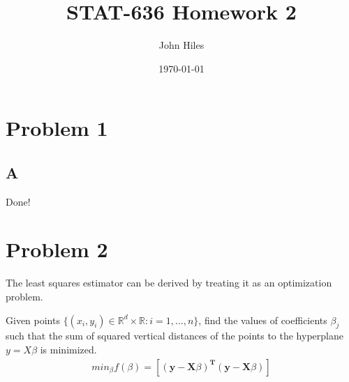 \documentclass{article}
\title{STAT-636 Homework 2}
\author{John Hiles}
\date\today
\begin{document}
\maketitle %

\section*{Problem 1}
\subsection*{A}
Done!
\section*{Problem 2}
The least squares estimator can be derived by treating it as an optimization problem.

Given points $\{(x_i ,y_i) \in \mathbb{R}^{d}\times \mathbb{R}:i = 1,...,n\}$, find the values of
coefficients $\beta_j$ such that the sum of squared vertical distances of the
points to the hyperplane $y = X\beta$ is minimized.
\begin{align*}
min_{\beta}f(\beta)=[(\textbf{y}-\textbf{X}\beta)^\textbf{T} (\textbf{y}-\textbf{X}\beta)]
\end{align*}
\end{document}
